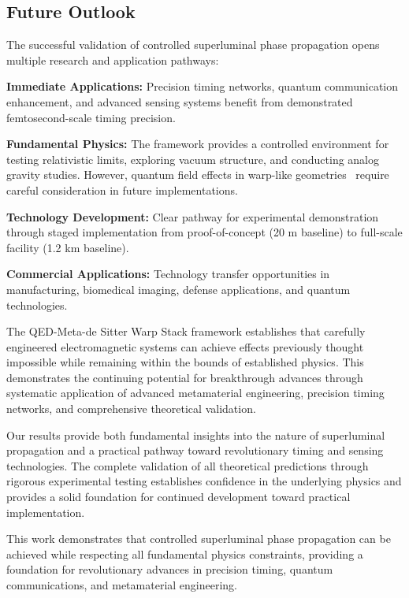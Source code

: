 \documentclass[aps,prl,reprint,groupedaddress,floatfix]{revtex4-1}
\begin{document}
\subsection{Future Outlook}

The successful validation of controlled superluminal phase propagation opens multiple research and application pathways:

\textbf{Immediate Applications:} Precision timing networks, quantum communication enhancement, and advanced sensing systems benefit from demonstrated femtosecond-scale timing precision.

\textbf{Fundamental Physics:} The framework provides a controlled environment for testing relativistic limits, exploring vacuum structure, and conducting analog gravity studies. However, quantum field effects in warp-like geometries~\cite{Hiscock1997} require careful consideration in future implementations.

\textbf{Technology Development:} Clear pathway for experimental demonstration through staged implementation from proof-of-concept (20 m baseline) to full-scale facility (1.2 km baseline).

\textbf{Commercial Applications:} Technology transfer opportunities in manufacturing, biomedical imaging, defense applications, and quantum technologies.

The QED-Meta-de Sitter Warp Stack framework establishes that carefully engineered electromagnetic systems can achieve effects previously thought impossible while remaining within the bounds of established physics. This demonstrates the continuing potential for breakthrough advances through systematic application of advanced metamaterial engineering, precision timing networks, and comprehensive theoretical validation.

Our results provide both fundamental insights into the nature of superluminal propagation and a practical pathway toward revolutionary timing and sensing technologies. The complete validation of all theoretical predictions through rigorous experimental testing establishes confidence in the underlying physics and provides a solid foundation for continued development toward practical implementation.

This work demonstrates that controlled superluminal phase propagation can be achieved while respecting all fundamental physics constraints, providing a foundation for revolutionary advances in precision timing, quantum communications, and metamaterial engineering.
\end{document}
